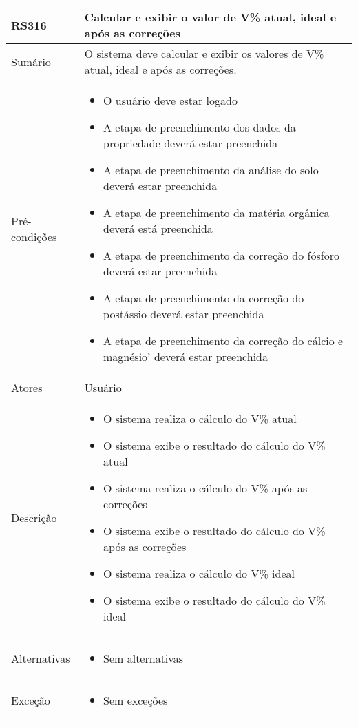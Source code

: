 \begin{quadro}[!htb]
    \begin{tabular}{|p{3cm}|p{11cm}|}
        \hline
        \textbf{RS316} & \textbf{Calcular e exibir o valor de V\% atual, ideal e após as correções} \\
        \hline
        Sumário        & O sistema deve calcular e exibir os valores de V\% atual, ideal e após as correções.                  \\
        \hline
        Pré-condições  & \begin{itemize}
            \item O usuário deve estar logado
            \item A etapa de preenchimento dos dados da propriedade deverá estar preenchida 
            \item A etapa de preenchimento da análise do solo deverá estar preenchida 
            \item A etapa de preenchimento da matéria orgânica deverá está preenchida 
            \item A etapa de preenchimento da correção do fósforo deverá estar preenchida 
            \item A etapa de preenchimento da correção do postássio deverá estar preenchida 
            \item A etapa de preenchimento da correção do cálcio e magnésio' deverá estar preenchida 
        \end{itemize}                 \\
        \hline
        Atores         & Usuário                  \\
        \hline
        Descrição      &
        \begin{itemize}
            \item O sistema realiza o cálculo do V\% atual
            \item O sistema exibe o resultado do cálculo do V\% atual
            \item O sistema realiza o cálculo do V\% após as correções
            \item O sistema exibe o resultado do cálculo do V\% após as correções
            \item O sistema realiza o cálculo do V\% ideal
            \item O sistema exibe o resultado do cálculo do V\% ideal
        \end{itemize}                 \\
        \hline
        Alternativas   &
        \begin{itemize}
            \item Sem alternativas
        \end{itemize}                 \\
        \hline
        Exceção        &
        \begin{itemize}
            \item Sem exceções
        \end{itemize}                   \\
        \hline
    \end{tabular}
\end{quadro}